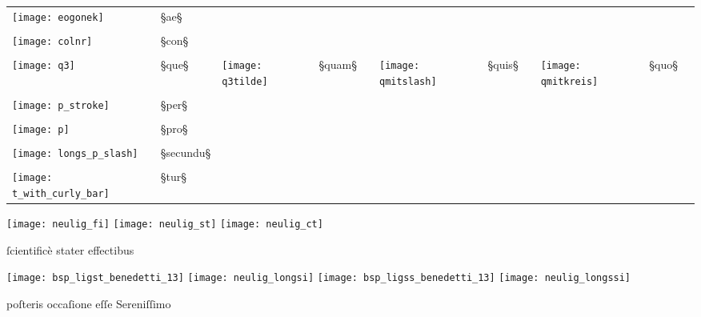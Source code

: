 \begin{liste}
\begin{longtable}[l]{lllllllllll}
\texttt{[image: eogonek]} & §{ae}§ \\ \\
\texttt{[image: colnr]} & §{con}§
\\ \\
\texttt{[image: q3]} & §{que}§
&
\texttt{[image: q3tilde]} & §{quam}§
&&
\texttt{[image: qmitslash]} & §{quis}§
&&
\texttt{[image: qmitkreis]} & §{quo}§
\\ \\
\texttt{[image: p\_stroke]} & §{per}§
\\ \\
\texttt{[image: p]} & §{pro}§
\\ \\
\texttt{[image: longs\_p\_slash]} & §{secundu}§
\\ \\
\texttt{[image: t\_with\_curly\_bar]} & §{tur}§
\end{longtable}
\end{liste}

\begin{example}

\texttt{[image: neulig\_fi]} \quad
\texttt{[image: neulig\_st]} \quad
\texttt{[image: neulig\_ct]}

\vspace{-3mm}
\begin{typeLatin}
ſcientificè     \bold{_}stater\bold{_}     effectibus
\end{typeLatin}

\texttt{[image: bsp\_ligst\_benedetti\_13]} \quad
\texttt{[image: neulig\_longsi]} \quad
\texttt{[image: bsp\_ligss\_benedetti\_13]} \quad
\texttt{[image: neulig\_longssi]}

\vspace{-3mm}
\begin{typeLatin}
poſteris        occaſione          eſſe     Sereniſſimo
\end{typeLatin}

\end{example}

